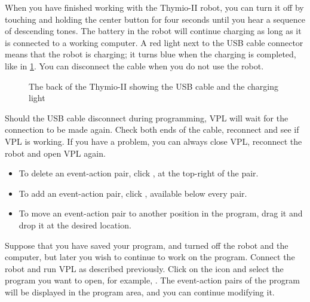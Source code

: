 
When you have finished working with the Thymio-II robot, you can turn it
off by touching and holding the center button for four seconds until
you hear a sequence of descending tones. The battery in the robot will
continue charging as long as it is connected to a working computer. A
red light next to the USB cable connector means that the robot is
charging; it turns blue when the charging is completed, like in \cref{fig.back}.
You can disconnect the cable when you do not use the robot.


\begin{figure}
\begin{center}
\caption{The back of the Thymio-II showing the USB cable and the
 charging light}\label{fig.back}
\end{center}
\end{figure}

Should the USB cable disconnect during programming, VPL will wait for the connection to be made again.
Check both ends of the cable, reconnect and see if VPL is working.
If you have a problem, you can always close VPL, reconnect the robot and open VPL again.


\begin{itemize}

\item To delete an event-action pair, click , at the top-right of the pair.
\item To add an event-action pair, click , available below every pair.
\item To move an event-action pair to another position in the program, drag it and drop it at the desired location.

\end{itemize}


Suppose that you have saved your program, and turned off the robot and
the computer, but later you wish to continue to work on the program.
Connect the robot and run VPL as described previously. Click on the icon
 and select the program you want to open, for example,
. The event-action pairs of the program will be displayed in
the program area, and you can continue modifying it.

